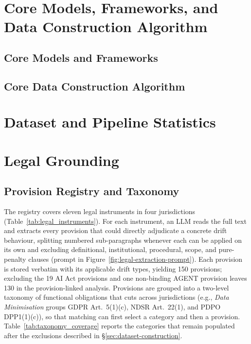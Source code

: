 \section{Core Models, Frameworks, and Data Construction Algorithm}
\label{app:core-suite}

\subsection{Core Models and Frameworks}
\label{app:core-models-and-frameworks}


\subsection{Core Data Construction Algorithm}
\label{app:core-data-algorithm}


\section{Dataset and Pipeline Statistics}
\label{app:dataset-stats}



\section{Legal Grounding}
\label{app:legal}

\subsection{Provision Registry and Taxonomy}
\label{app:legal-registry}

The registry covers eleven legal instruments in four jurisdictions (Table~\ref{tab:legal_instruments}). For each instrument, an LLM reads the full text and extracts every provision that could directly adjudicate a concrete drift behaviour, splitting numbered sub-paragraphs whenever each can be applied on its own and excluding definitional, institutional, procedural, scope, and pure-penalty clauses (prompt in Figure~\ref{fig:legal-extraction-prompt}). Each provision is stored verbatim with its applicable drift types, yielding 150 provisions; excluding the 19 AI Act provisions and one non-binding AGENT provision leaves 130 in the provision-linked analysis. Provisions are grouped into a two-level taxonomy of functional obligations that cuts across jurisdictions (e.g., \emph{Data Minimisation} groups GDPR Art.~5(1)(c), NDSR Art.~22(1), and PDPO DPP1(1)(c)), so that matching can first select a category and then a provision. Table~\ref{tab:taxonomy_coverage} reports the categories that remain populated after the exclusions described in \S\ref{sec:dataset-construction}.

